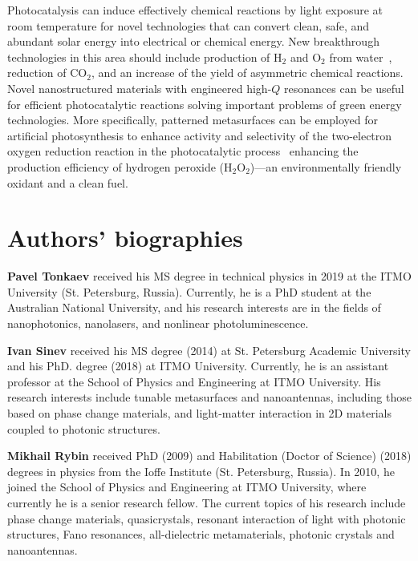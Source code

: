 \documentclass[journal=chreay,manuscript=review]{achemso}
\begin{document}
Photocatalysis can induce effectively chemical reactions by light exposure at room temperature for novel technologies that can convert clean, safe, and abundant solar energy into electrical or chemical energy.  New breakthrough technologies in this area should include production of H$_2$ and O$_2$ from water~\cite{nishiyama_2021}, reduction of CO$_2$, and an increase of the yield of asymmetric chemical reactions. Novel nanostructured materials with engineered high-$Q$ resonances can be useful for efficient photocatalytic reactions solving important problems of green energy technologies. More specifically, patterned metasurfaces can be employed for artificial photosynthesis to enhance activity and selectivity of the two-electron oxygen reduction reaction in the photocatalytic process~\cite{teng_2021} enhancing the production efficiency of hydrogen peroxide (H$_2$O$_2$)—an environmentally friendly oxidant and a clean fuel. 


\newpage

\section*{Authors' biographies}

{\bf Pavel Tonkaev} received his MS degree in technical physics in 2019 at the ITMO University (St. Petersburg, Russia). Currently, he is a PhD student at the Australian National University, and his research interests are in the fields of nanophotonics, nanolasers, and nonlinear photoluminescence.

{\bf Ivan Sinev} received his MS degree (2014) at St. Petersburg Academic University and his PhD. degree (2018) at ITMO University. Currently, he is an assistant professor at the School of Physics and Engineering at ITMO University. His research interests include tunable metasurfaces and nanoantennas, including those based on phase change materials, and light-matter interaction in 2D materials coupled to photonic structures.

{\bf Mikhail Rybin} received PhD (2009) and Habilitation (Doctor of Science) (2018) degrees in physics from the Ioffe Institute (St. Petersburg, Russia).  In 2010, he joined the School of Physics and Engineering at ITMO University, where currently he is a senior research fellow. The current topics of his research include phase change materials, quasicrystals, resonant interaction of light with photonic structures, Fano resonances, all-dielectric metamaterials, photonic crystals and nanoantennas.
\end{document}
